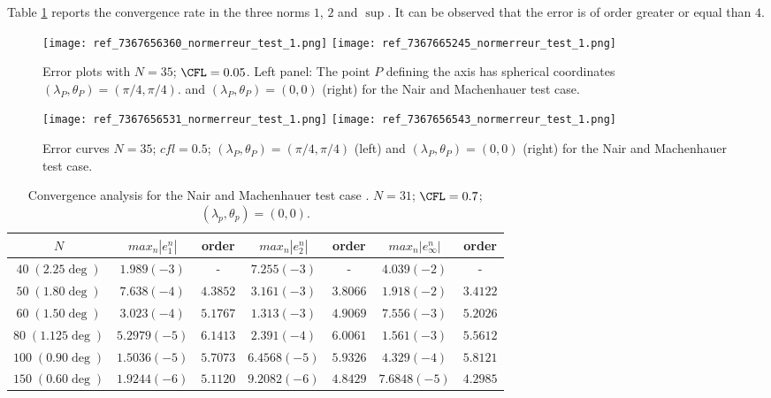 Table \ref{table:2.4} reports the convergence rate 
in the three norms $1$, $2$ and $\sup$. It can be observed
that the error is of order greater or equal than $4$. 

\begin{figure}[ht!]
\texttt{[image: ref\_7367656360\_normerreur\_test\_1.png]}
\texttt{[image: ref\_7367665245\_normerreur\_test\_1.png]}
\caption{Error plots with $N=35$; $\CFL=0.05$. Left panel: 
The point $P$ defining the axis has spherical coordinates  $(\lambda_P,  \theta_P) = (\pi / 4, \pi / 4)$. and $(\lambda_P, \theta_P) = (0,0)$ (right) for the Nair and Machenhauer test case.}
\label{erreur_cfl=0.05}
\end{figure}

\begin{figure}[ht!]
\texttt{[image: ref\_7367656531\_normerreur\_test\_1.png]}
\texttt{[image: ref\_7367656543\_normerreur\_test\_1.png]}
\caption{Error curves $N=35$; $cfl=0.5$; $(\lambda_P,  \theta_P) = (\pi / 4, \pi / 4)$ (left) and $(\lambda_P, \theta_P) = (0,0)$ (right) for the Nair and Machenhauer test case.}
\label{erreur_cfl=0.5}
\end{figure}

\begin{table}[ht!]
\begin{tabular}{|c||cc|cc|cc|}
\hline
$N$ & $max_n |e_1^n|$ & order  & $max_n |e_2^n|$ & order  & $max_n |e_{\infty}^n|$ & order \\
\hline
\hline
$40\;(2.25\deg)$ & $1.989 (-3)$ & -  & $7.255 (-3)$ & - & $4.039(-2)$  & - \\
\hline 
$50\;(1.80\deg)$ & $7.638 (-4)$ & $4.3852$ & $3.161(-3)$ & $3.8066$ & $1.918 (-2)$ & $3.4122$ \\
\hline
$60\;(1.50\deg)$ & $3.023(-4)$ & $5.1767$ & $1.313 (-3)$ & $4.9069$ & $7.556 (-3)$ & $5.2026$ \\
\hline
$80\;(1.125\deg)$ & $5.2979 (-5)$ & $6.1413$ & $2.391(-4)$ & $6.0061$ & $1.561(-3)$ & $5.5612$ \\
\hline
$100\;(0.90\deg)$ & $1.5036(-5)$ & $5.7073$ & $6.4568(-5)$ & $5.9326$ & $4.329(-4)$ & $5.8121$\\
\hline
$150\;(0.60\deg)$ & $1.9244(-6)$ & $5.1120$ & $9.2082(-6)$ & $4.8429$ & $7.6848(-5)$ & $4.2985$\\
\hline
\end{tabular}
\caption{Convergence analysis for the Nair and Machenhauer test case \cite{Nair-Machenhauer}. 
$N=31$; $\CFL = 0.7$; $(\lambda_p, \theta_p) = (0,0)$.}
\label{table:2.4}
\end{table}

